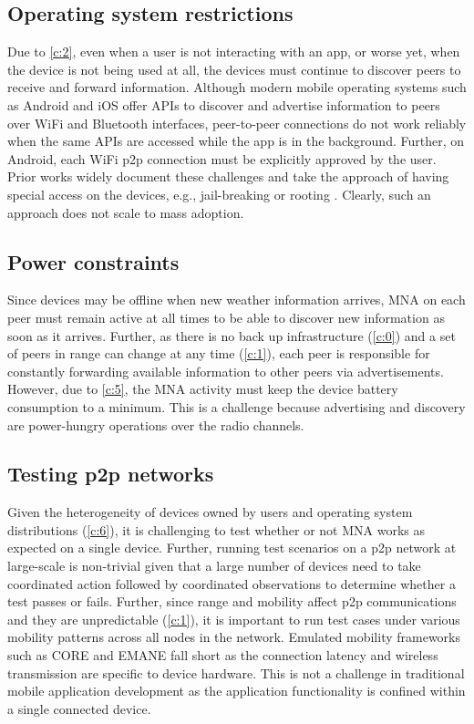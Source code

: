 \documentclass[conference]{IEEEtran}
\begin{document}
\subsection{Operating system restrictions}
\label{ch:os}
%
Due to \ref{c:2}, even when a user is not interacting with an app, or
worse yet, when the device is not being used at all, the devices must
continue to discover peers to receive and forward
information. Although modern mobile operating systems such as Android
and iOS offer APIs to discover and advertise information to peers over
WiFi and Bluetooth interfaces, peer-to-peer connections do not work
reliably when the same APIs are accessed while the app is in the
background. Further, on Android, each WiFi p2p connection must be
explicitly approved by the user. Prior works widely document
these challenges and take the approach of having special access on the
devices, e.g., jail-breaking or rooting
\cite{gardner-stephen-serval-2011}. Clearly, such an approach does not
scale to mass adoption.\\
%
\subsection{Power constraints}
\label{ch:power}
%
Since devices may be offline when new weather information arrives, MNA
on each peer must remain active at all times to be able to discover
new information as soon as it arrives. Further, as there is no back up
infrastructure (\ref{c:0}) and a set of peers in range can change at
any time (\ref{c:1}), each peer is responsible for constantly
forwarding available information to other peers via
advertisements. However, due to \ref{c:5}, the MNA activity must keep
the device battery consumption to a minimum. This is a challenge
because advertising and discovery are power-hungry operations over the
radio channels.
%
\subsection{Testing p2p networks}
%
Given the heterogeneity of devices owned by users and operating system
distributions (\ref{c:6}), it is challenging to test whether or not
MNA works as expected on a single device. Further, running test
scenarios on a p2p network at large-scale is non-trivial given that a
large number of devices need to take coordinated action
followed by coordinated observations to determine whether a test
passes or fails. Further, since range and mobility affect p2p
communications and they are unpredictable (\ref{c:1}), it is important
to run test cases under various mobility patterns across all nodes in
the network.  Emulated mobility frameworks such as CORE
\cite{arenholz-core-2008} and EMANE \cite{emane} fall short as the
connection latency and wireless transmission are specific to device
hardware.  This is not a challenge in traditional mobile
application development as the application functionality is confined
within a single connected device.
%
\end{document}
